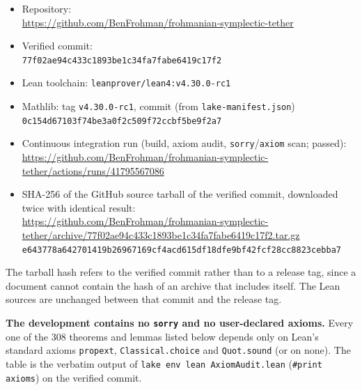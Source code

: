 \documentclass[11pt]{article}
\theoremstyle{definition}
\theoremstyle{remark}
\begin{document}
{\raggedright
\begin{itemize}
\item Repository:\\ {\footnotesize\url{https://github.com/BenFrohman/frohmanian-symplectic-tether}}
\item Verified commit:\\ {\footnotesize\texttt{77f02ae94c433c1893be1c34fa7fabe6419c17f2}}
\item Lean toolchain: \texttt{leanprover/lean4:v4.30.0-rc1}
\item Mathlib: tag \texttt{v4.30.0-rc1}, commit (from \texttt{lake-manifest.json})\\ {\footnotesize\texttt{0c154d67103f74be3a0f2c509f72ccbf5be9f2a7}}
\item Continuous integration run (build, axiom audit, \texttt{sorry}/\texttt{axiom} scan; passed):\\ {\footnotesize\url{https://github.com/BenFrohman/frohmanian-symplectic-tether/actions/runs/41795567086}}
\item SHA-256 of the GitHub source tarball of the verified commit, downloaded twice with identical result:\\ {\footnotesize\url{https://github.com/BenFrohman/frohmanian-symplectic-tether/archive/77f02ae94c433c1893be1c34fa7fabe6419c17f2.tar.gz}}\\
{\footnotesize\texttt{e643778a642701419b26967169cf4acd615df18dfe9bf42fcf28cc8823cebba7}}
\end{itemize}\par}

The tarball hash refers to the verified commit rather than to a release tag, since a document cannot contain the hash of an archive that includes itself. The Lean sources are unchanged between that commit and the release tag.

\textbf{The development contains no \texttt{sorry} and no user-declared axioms.} Every one of the 308 theorems and lemmas listed below depends only on Lean's standard axioms \texttt{propext}, \texttt{Classical.choice} and \texttt{Quot.sound} (or on none). The table is the verbatim output of \texttt{lake env lean AxiomAudit.lean} (\texttt{\#print axioms}) on the verified commit.
\end{document}
